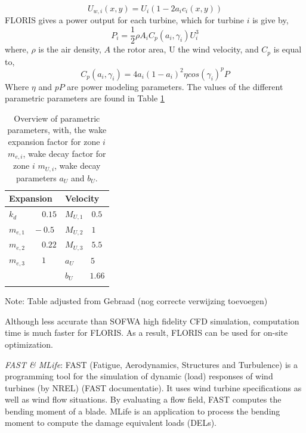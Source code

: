 \documentclass[twoside,twocolumn]{article}
\begin{document}
\begin{equation}
\label{eq:Uw}
U_{w,i}(x,y) = U_i\left( {1-2a_ic_i(x,y)} \right)
\end{equation}
 FLORIS gives a power output for each turbine, which for turbine $i$ is give by,
\begin{equation}
\label{eq:P}
P_i = \frac{1}{2} \rho A_i C_p(a_i, \gamma_i)U_i^3
\end{equation}
where, $\rho$ is the air density, $A$ the rotor area, U the wind velocity, and $C_p$ is equal to,
\begin{equation}
\label{eq:Cp}
C_p(a_i, \gamma_i) = 4a_i(1-a_i)^2 \eta cos(\gamma_i)^pP
\end{equation}
Where $\eta$ and $pP$ are power modeling parameters.
The values of the different parametric parameters are found in Table \ref{tab:para}
\begin{table}[h]
	\caption{Overview of parametric parameters, with, the wake expansion factor for zone $i$ $m_{e,i}$, wake decay factor for zone $i$ $m_{U,i}$, wake decay parameters $a_U$ and $b_U$.}
	\centering
	\begin{tabular}{ll}
	\hline
	Expansion & Velocity  \\ 
	\hline
	$k_d \qquad \quad 0.15$ & $M_{U,1} \quad 0.5$ \\
	$m_{e,1} \quad -0.5$ & $M_{U,2} \quad 1$ \\
	$m_{e,2} \qquad 0.22$ & $M_{U,3} \quad 5.5$ \\
	$m_{e,3} \qquad 1$ & $a_U \qquad 5$ \\
	& $b_U \qquad 1.66$ \\
	\hline
	\label{tab:para}
	\end{tabular}

Note: Table adjusted from Gebraad \cite{Gebraad2016}(nog correcte verwijzing toevoegen)
\end{table}

 Although less accurate than  SOFWA high fidelity CFD simulation, computation time is much faster for FLORIS. As a result, FLORIS can be used for on-site optimization. 



\textit{FAST \& MLife}: FAST (Fatigue, Aerodynamics, Structures and Turbulence) is a programming tool for the simulation of dynamic (load) responses of wind turbines (by NREL) (FAST documentatie). It uses wind turbine specifications as well as wind flow situations. By evaluating a flow field, FAST computes the bending moment of a blade. MLife is an application to process the bending moment to compute the damage equivalent loads (DELs). 
\end{document}
